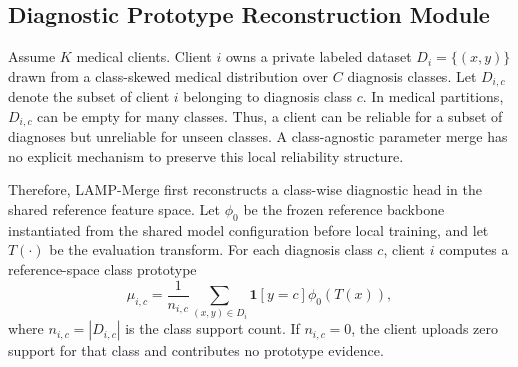 \documentclass[letterpaper]{article} %
\begin{document}
\subsection{Diagnostic Prototype Reconstruction Module}
Assume $K$ medical clients. Client $i$ owns a private labeled dataset $D_i=\{(x,y)\}$ drawn from a class-skewed medical distribution over $C$ diagnosis classes. Let $D_{i,c}$ denote the subset of client $i$ belonging to diagnosis class $c$. In medical partitions, $D_{i,c}$ can be empty for many classes. Thus, a client can be reliable for a subset of diagnoses but unreliable for unseen classes. A class-agnostic parameter merge has no explicit mechanism to preserve this local reliability structure.


Therefore, LAMP-Merge first reconstructs a class-wise diagnostic head in the shared reference feature space. Let $\phi_0$ be the frozen reference backbone instantiated from the shared model configuration before local training, and let $T(\cdot)$ be the evaluation transform. For each diagnosis class $c$, client $i$ computes a reference-space class prototype
\begin{equation}
\mu_{i,c}=\frac{1}{n_{i,c}}\sum_{(x,y)\in D_i}\mathbf{1}[y=c]\phi_0(T(x)),
\end{equation}
where $n_{i,c}=|D_{i,c}|$ is the class support count. If $n_{i,c}=0$, the client uploads zero support for that class and contributes no prototype evidence.
\end{document}
